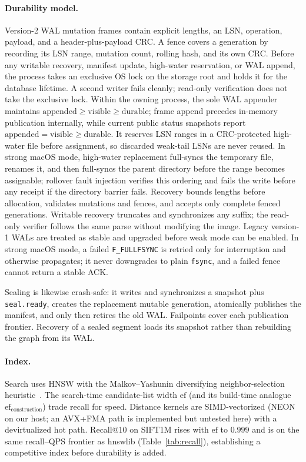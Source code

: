 \documentclass[sigconf,nonacm,balance=false]{acmart}
\newcommand{\fullfsync}{\texttt{F\_FULLFSYNC}}
\newcommand{\fsync}{\texttt{fsync}}
\begin{document}
\paragraph{Durability model.} Version-2 WAL mutation frames contain explicit
lengths, an LSN, operation, payload, and a header-plus-payload CRC. A fence covers
a generation by recording its LSN range, mutation count, rolling hash, and its own
CRC. Before any writable recovery, manifest update, high-water reservation, or
WAL append, the process takes an exclusive OS lock on the storage root and holds
it for the database lifetime. A second writer fails cleanly; read-only
verification does not take the exclusive lock. Within the owning process, the
sole WAL appender maintains
$\mathrm{appended}\ge\mathrm{visible}\ge\mathrm{durable}$; frame append precedes
in-memory publication internally, while current public status snapshots report
$\mathrm{appended}=\mathrm{visible}\ge\mathrm{durable}$. It reserves LSN ranges
in a CRC-protected high-water file before assignment, so discarded weak-tail LSNs
are never reused. In strong macOS mode, high-water replacement full-syncs the
temporary file, renames it, and then full-syncs the parent directory before the
range becomes assignable; rollover fault injection verifies this ordering and
fails the write before any receipt if the directory barrier fails. Recovery
bounds lengths before allocation, validates mutations
and fences, and accepts only complete fenced generations. Writable recovery
truncates and synchronizes any suffix; the read-only verifier follows the same
parse without modifying the image. Legacy version-1 WALs are treated as stable
and upgraded before weak mode can be enabled. In strong macOS mode, a failed
\fullfsync{} is retried only for interruption and otherwise propagates; it never
downgrades to plain \fsync{}, and a failed fence cannot return a stable ACK.

Sealing is likewise crash-safe: it writes and synchronizes a snapshot plus
\texttt{seal.ready}, creates the replacement mutable generation, atomically
publishes the manifest, and only then retires the old WAL. Failpoints cover each
publication frontier. Recovery of a sealed segment loads its snapshot rather than
rebuilding the graph from its WAL.

\paragraph{Index.} Search uses HNSW with the Malkov--Yashunin diversifying
neighbor-selection heuristic~\cite{hnsw}. The search-time candidate-list width
$\mathrm{ef}$ (and its build-time analogue $\mathrm{ef}_{\mathrm{construction}}$)
trade recall for speed. Distance kernels are SIMD-vectorized (NEON on our host;
an AVX+FMA path is implemented but untested here) with a devirtualized hot path.
Recall@10 on SIFT1M rises with $\mathrm{ef}$ to $0.999$ and is on the same
recall--QPS frontier as hnswlib (Table~\ref{tab:recall}), establishing a
competitive index before durability is added.
\end{document}
